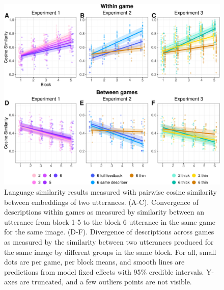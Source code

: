 \documentclass[9pt,twocolumn,twoside]{pnas-new}
\begin{document}
\begin{figure}[t!]

{\centering \includegraphics[width=1\linewidth]{sbert-1.pdf} 

}

\caption{Language similarity results measured with pairwise cosine similarity between embeddings of two utterances. (A-C). Convergence of descriptions within games as measured by similarity between an utterance from block 1-5 to the block 6 utterance in the same game for the same image. (D-F). Divergence of descriptions across games as measured by the similarity between two utterances produced for the same image by different groups in the same block. For all, small dots are per game, per block means, and smooth lines are predictions from model fixed effects with 95\% credible intervals. Y-axes are truncated, and a few outliers points are not visible.}
\end{figure}
\end{document}

